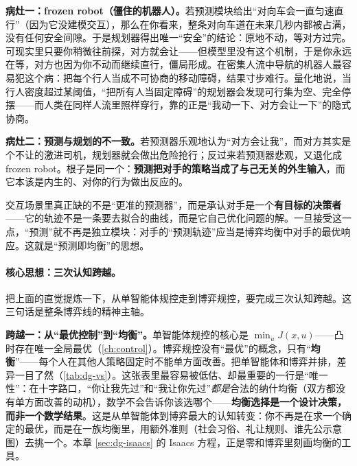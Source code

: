 \textbf{病灶一：frozen robot（僵住的机器人）。}\;若预测模块给出“对向车会一直匀速直行”（因为它没建模交互），那么在你看来，整条对向车道在未来几秒内都被占满，没有任何安全间隙。于是规划器得出唯一“安全”的结论：原地不动，等对方过完。可现实里只要你稍微往前探，对方就会让——但模型里没有这个机制，于是你永远在等，对方也因为你不动而继续直行，僵局形成。在密集人流中导航的机器人最容易犯这个病：把每个行人当成不可协商的移动障碍，结果寸步难行。量化地说，当行人密度超过某阈值，“把所有人当固定障碍”的规划器会发现可行集为空、完全停摆——而人类在同样人流里照样穿行，靠的正是“我动一下、对方会让一下”的隐式协商。

\textbf{病灶二：预测与规划的不一致。}\;若预测器乐观地认为“对方会让我”，而对方其实是个不让的激进司机，规划器就会做出危险抢行；反过来若预测器悲观，又退化成 frozen robot。根子是同一个：\textbf{预测把对手的策略当成了与己无关的外生输入}，而它本该是内生的、对你的行为做出反应的。

\begin{insight}
交互场景里真正缺的不是“更准的预测器”，而是承认对手是一个\textbf{有目标的决策者}——它的轨迹不是一条要去拟合的曲线，而是它自己优化问题的解。一旦接受这一点，“预测”就不再是独立模块：对手的“预测轨迹”应当是博弈均衡中对手的最优响应。这就是“预测即均衡”的思想。
\end{insight}

\paragraph{核心思想：三次认知跨越。}
把上面的直觉提炼一下，从单智能体规控走到博弈规控，要完成三次认知跨越。这三句话是整条博弈线的精神主轴。

\textbf{跨越一：从“最优控制”到“均衡”。}\;单智能体规控的核心是 $\min_u J(x,u)$——凸时存在唯一全局最优（\cref{ch:control}）。博弈规控没有“最优”的概念，只有“\textbf{均衡}”——每个人在其他人策略固定时不能单方面改善。把单智能体和博弈并排，差异一目了然（\cref{tab:dg-vs}）。这张表里最容易被低估、却最重要的一行是“唯一性”：在十字路口，“你让我先过”和“我让你先过”\emph{都是}合法的纳什均衡（双方都没有单方面改善的动机），数学不会告诉你该选哪个——\textbf{均衡选择是一个设计决策，而非一个数学结果}。这是从单智能体到博弈最大的认知转变：你不再是在求一个确定的最优，而是在一族均衡里，用额外准则（社会习俗、礼让规则、谁先公示意图）去挑一个。本章 \cref{sec:dg-isaacs} 的 Isaacs 方程，正是零和博弈里刻画均衡的工具。

